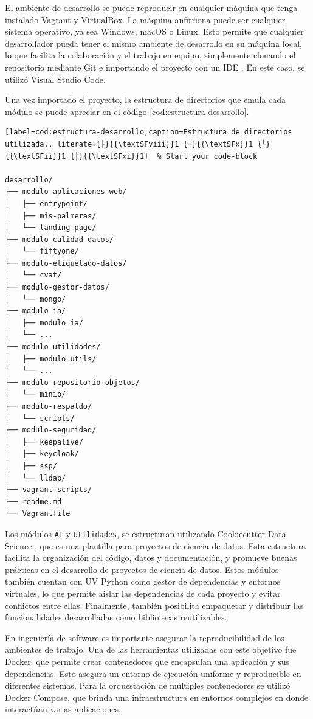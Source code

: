 El ambiente de desarrollo se puede reproducir en cualquier máquina que tenga instalado Vagrant y VirtualBox. La máquina anfitriona puede ser cualquier sistema operativo, ya sea Windows, macOS o Linux. Esto permite que cualquier desarrollador pueda tener el mismo ambiente de desarrollo en su máquina local, lo que facilita la colaboración y el trabajo en equipo, simplemente clonando el repositorio \citep{masoller_bruno_repositorio_nodate} mediante Git e importando el proyecto con un IDE \citep{wikipedia_entorno_2025}. En este caso, se utilizó Visual Studio Code.

Una vez importado el proyecto, la estructura de directorios que emula cada módulo se puede apreciar en el código \ref{cod:estructura-desarrollo}.

\clearpage

\begin{lstlisting}[label=cod:estructura-desarrollo,caption=Estructura de directorios utilizada., literate={├}{{\textSFviii}}1 {─}{{\textSFx}}1 {└}{{\textSFii}}1 {│}{{\textSFxi}}1]  % Start your code-block

desarrollo/
├── modulo-aplicaciones-web/
│   ├── entrypoint/ 
│   ├── mis-palmeras/
│   └── landing-page/
├── modulo-calidad-datos/
│   └── fiftyone/
├── modulo-etiquetado-datos/
│   └── cvat/
├── modulo-gestor-datos/
│   └── mongo/
├── modulo-ia/
│   ├── modulo_ia/
│   └── ...
├── modulo-utilidades/
│   ├── modulo_utils/
│   └── ...
├── modulo-repositorio-objetos/
│   └── minio/
├── modulo-respaldo/
│   └── scripts/
├── modulo-seguridad/
│   ├── keepalive/
│   ├── keycloak/
│   ├── ssp/
│   └── lldap/
├── vagrant-scripts/
├── readme.md
└── Vagrantfile

\end{lstlisting}

Los módulos \texttt{AI} y \texttt{Utilidades}, se estructuran utilizando Cookiecutter Data Science \citep{drivendata_cookiecutter_nodate}, que es una plantilla para proyectos de ciencia de datos. Esta estructura facilita la organización del código, datos y documentación,  y promueve buenas prácticas en el desarrollo de proyectos de ciencia de datos. Estos módulos también cuentan con UV Python como gestor de dependencias y entornos virtuales, lo que permite aislar las dependencias de cada proyecto y evitar conflictos entre ellas. Finalmente, también posibilita empaquetar y distribuir las funcionalidades desarrolladas como bibliotecas reutilizables.

En ingeniería de software es importante asegurar la reproducibilidad de los ambientes de trabajo. Una de las herramientas utilizadas con este objetivo fue Docker, que permite crear contenedores que encapsulan una aplicación y sus dependencias. Esto asegura un entorno de ejecución uniforme y reproducible en diferentes sistemas. Para la orquestación de múltiples contenedores se utilizó Docker Compose, que brinda una infraestructura en entornos complejos en donde interactúan varias aplicaciones.

